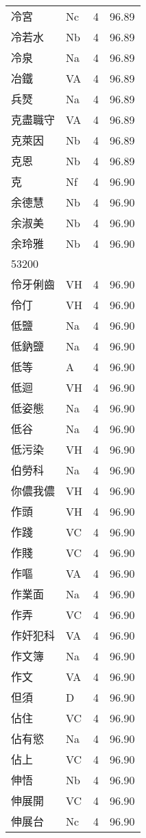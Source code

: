 \documentclass[twocolumn]{book}
\begin{document}
\begin{supertabular}{llrr}
冷宮 & Nc & 4 &  96.89\\
冷若水 & Nb & 4 &  96.89\\
冷泉 & Na & 4 &  96.89\\
冶鐵 & VA & 4 &  96.89\\
兵燹 & Na & 4 &  96.89\\
克盡職守 & VA & 4 &  96.89\\
克萊因 & Nb & 4 &  96.89\\
克恩 & Nb & 4 &  96.89\\
克 & Nf & 4 &  96.90\\
余德慧 & Nb & 4 &  96.90\\
余淑美 & Nb & 4 &  96.90\\
余玲雅 & Nb & 4 &  96.90\\
53200\\
伶牙俐齒 & VH & 4 &  96.90\\
伶仃 & VH & 4 &  96.90\\
低鹽 & Na & 4 &  96.90\\
低鈉鹽 & Na & 4 &  96.90\\
低等 & A & 4 &  96.90\\
低迴 & VH & 4 &  96.90\\
低姿態 & Na & 4 &  96.90\\
低谷 & Na & 4 &  96.90\\
低污染 & VH & 4 &  96.90\\
伯勞科 & Na & 4 &  96.90\\
你儂我儂 & VH & 4 &  96.90\\
作頭 & VH & 4 &  96.90\\
作踐 & VC & 4 &  96.90\\
作賤 & VC & 4 &  96.90\\
作嘔 & VA & 4 &  96.90\\
作業面 & Na & 4 &  96.90\\
作弄 & VC & 4 &  96.90\\
作奸犯科 & VA & 4 &  96.90\\
作文簿 & Na & 4 &  96.90\\
作文 & VA & 4 &  96.90\\
但須 & D & 4 &  96.90\\
佔住 & VC & 4 &  96.90\\
佔有慾 & Na & 4 &  96.90\\
佔上 & VC & 4 &  96.90\\
伸悟 & Nb & 4 &  96.90\\
伸展開 & VC & 4 &  96.90\\
伸展台 & Nc & 4 &  96.90\\

\end{supertabular}
\end{document}
